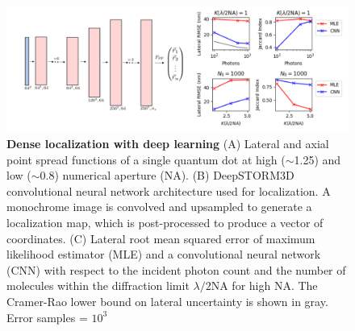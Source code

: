 \documentclass{ucetd}
\begin{document}
\begin{figure}
\begin{center}
\includegraphics[width=14cm]{PSF2D-Crop.png}
\end{center}
\caption{\textbf{Dense localization with deep learning} (A) Lateral and axial point spread functions of a single quantum dot at high ($\sim$1.25) and low ($\sim$0.8) numerical aperture (NA). (B) DeepSTORM3D convolutional neural network architecture used for localization. A monochrome image is convolved and upsampled to generate a localization map, which is post-processed to produce a vector of coordinates. (C) Lateral root mean squared error of maximum likelihood estimator (MLE) and a convolutional neural network (CNN) with respect to the incident photon count and the number of molecules within the diffraction limit $\lambda/2\mathrm{NA}$ for high NA. The Cramer-Rao lower bound on lateral uncertainty is shown in gray. Error samples = $10^{3}$}
\end{figure}
\end{document}
